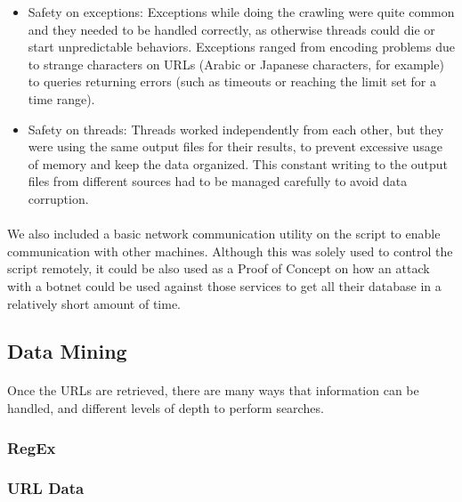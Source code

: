 \documentclass[12pt]{article}
\begin{document}
\begin{itemize}

\item  Safety on exceptions: Exceptions while doing the crawling were quite common and they needed to be handled correctly, as otherwise threads could die or start unpredictable behaviors. Exceptions ranged from encoding problems due to strange characters on URLs (Arabic or Japanese characters, for example) to queries returning errors (such as timeouts or reaching the limit set for a time range).

\item  Safety on threads: Threads worked independently from each other, but they were using the same output files for their results, to prevent excessive usage of memory and keep the data organized. This constant writing to the output files from different sources had to be managed carefully to avoid data corruption.

\end{itemize}

\paragraph{}
We also included a basic network communication utility on the script to enable communication with other machines. Although this was solely used to control the script remotely, it could be also used as a Proof of Concept on how an attack with a botnet could be used against those services to get all their database in a relatively short amount of time.

\subsection{Data Mining}

\paragraph{}
Once the URLs are retrieved, there are many ways that information can be handled, and different levels of depth to perform searches.

\subsubsection{RegEx}

\subsubsection{URL Data}
\end{document}
